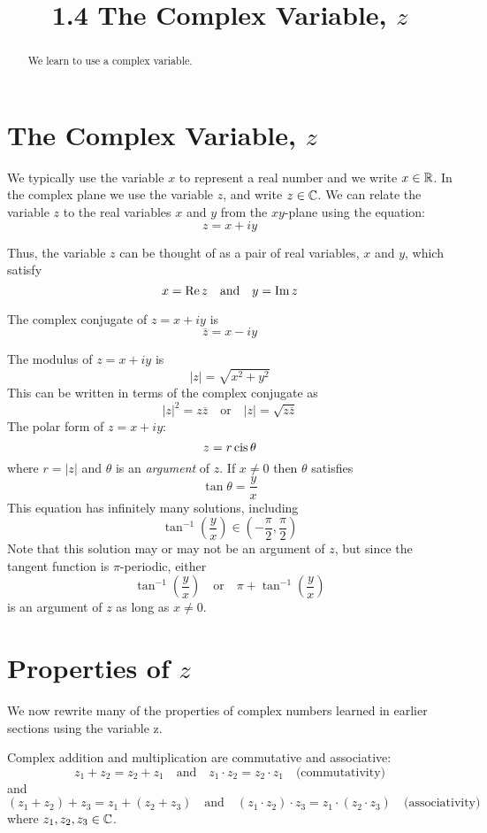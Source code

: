 \documentclass[handout]{ximera}
\title{1.4 The Complex Variable, $z$}
\begin{document}
\begin{abstract}
We learn to use a complex variable.
\end{abstract}

\maketitle

\section{The Complex Variable, $z$}

We typically use the variable $x$ to represent a real number and we write $x \in \mathbb R$.
In the complex plane we use the variable $z$, and write $z \in \mathbb C$. We can relate the variable $z$ to the real variables $x$ and $y$
from the $xy$-plane using the equation:
\[
z = x+iy
\]

Thus, the variable $z$ can be thought of as a pair of real variables, $x$ and $y$, 
which satisfy
\[
x = \operatorname{Re}{z} \quad \mbox{and} \quad y = \operatorname{Im}{z}
\]

The complex conjugate of $z = x+iy$ is
\[
\overline{z} = x-iy
\]

The modulus of $z = x+iy$ is
\[
|z| = \sqrt{x^2 + y^2}
\]
This can be written in terms of the complex conjugate as
\[
|z|^2 = z\overline{z} \quad \mbox{or} \quad |z| = \sqrt{z\overline{z}}
\]
The polar form of $z = x+iy$:
\[
z = r \operatorname{cis} \theta
\]
where $r = |z|$ and $\theta$ is an {\it argument} of $z$. If $x \neq 0$ then $\theta$ satisfies
\[
\tan \theta = \frac{y}{x}
\]
This equation has infinitely many solutions, including
\[ 
\tan^{-1} \left(\frac{y}{x}\right) \in \left(-\frac{\pi}{2}, \frac{\pi}{2}\right)
\]
Note that this solution may or may not be an argument of $z$, but since the tangent function is $\pi$-periodic,
either
\[
\tan^{-1} \left(\frac{y}{x}\right) \quad \mbox{or} \quad \pi + \tan^{-1} \left(\frac{y}{x}\right)
\]
is an argument of $z$ as long as $x \neq 0$.


\section{Properties of $z$}


We now rewrite many of the properties of complex numbers learned in earlier sections using the variable z.


Complex addition and multiplication are commutative and associative: 
\[
z_1 + z_2 = z_2 + z_1 \quad \mbox{and} \quad z_1 \cdot z_2 = z_2 \cdot z_1 \quad \mbox{(commutativity)}
\]
and
\[
(z_1 + z_2) + z_3  = z_1 + (z_2 + z_3) \quad \mbox{and} \quad (z_1 \cdot z_2) \cdot z_3  = z_1 \cdot (z_2 \cdot z_3) \quad \mbox{(associativity)}
\]
where $z_1, z_2, z_3 \in \mathbb C$.
\end{document}
